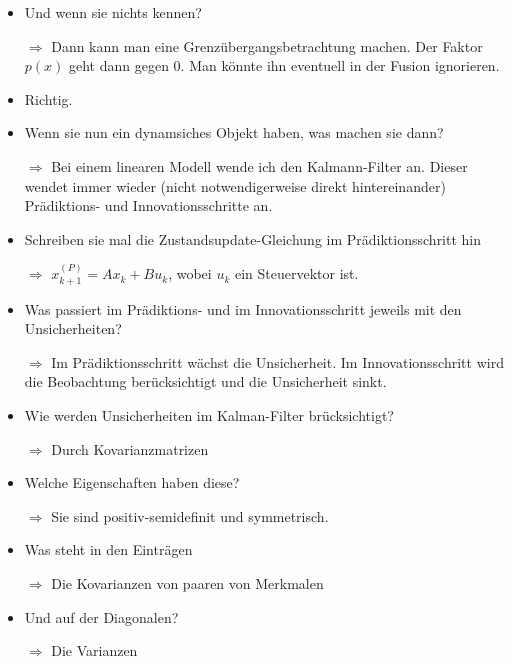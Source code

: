 \documentclass[a4paper]{article}
\begin{document}
\begin{itemize}
        \item Und wenn sie nichts kennen?
        \item[$\Rightarrow$] Dann kann man eine Grenzübergangsbetrachtung machen. Der Faktor $p(x)$ geht dann gegen 0. Man könnte ihn eventuell in der Fusion ignorieren.
        \item Richtig.
        \item Wenn sie nun ein dynamsiches Objekt haben, was machen sie dann?
        \item[$\Rightarrow$] Bei einem linearen Modell wende ich den Kalmann-Filter an. Dieser wendet immer wieder (nicht notwendigerweise direkt hintereinander) Prädiktions- und Innovationsschritte an.
        \item Schreiben sie mal die Zustandsupdate-Gleichung im Prädiktionsschritt hin
        \item[$\Rightarrow$] $x_{k+1}^{(P)} = A x_k + B u_k$, wobei $u_k$ ein Steuervektor ist.
        \item Was passiert im Prädiktions- und im Innovationsschritt jeweils mit den Unsicherheiten?
        \item[$\Rightarrow$] Im Prädiktionsschritt wächst die Unsicherheit. Im Innovationsschritt wird die Beobachtung berücksichtigt und die Unsicherheit sinkt.
        \item Wie werden Unsicherheiten im Kalman-Filter brücksichtigt?
        \item[$\Rightarrow$] Durch Kovarianzmatrizen
        \item Welche Eigenschaften haben diese?
        \item[$\Rightarrow$] Sie sind positiv-semidefinit und symmetrisch.
        \item Was steht in den Einträgen
        \item[$\Rightarrow$] Die Kovarianzen von paaren von Merkmalen
        \item Und auf der Diagonalen?
        \item[$\Rightarrow$] Die Varianzen
    \end{itemize}
\end{document}
